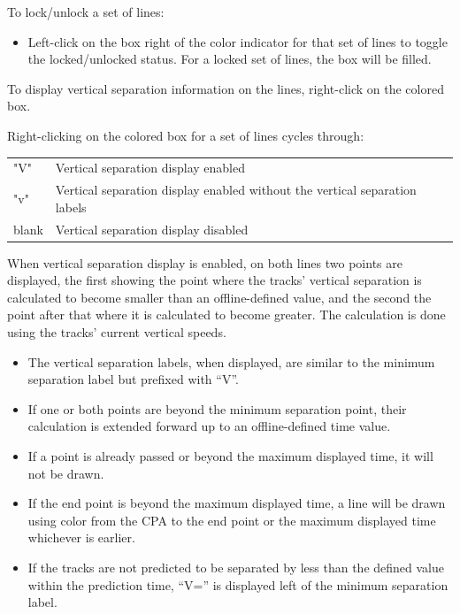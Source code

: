 \documentclass[a4paper,oneside,11pt]{memoir}
\begin{document}
\bigskip

To lock/unlock a set of lines:

\begin{itemize}
    \item Left-click on the box right of the color indicator for that set of lines to toggle the locked/unlocked status. For a locked set of lines, the box will be filled.
\end{itemize}

\bigskip

To display vertical separation information on the lines, right-click on the colored box.

Right-clicking on the colored box for a set of lines cycles through:

\begin{longtable}{p{5cm} p{7.5cm}}
  "V"   & Vertical separation display enabled\\
  "v"   & Vertical separation display enabled without the vertical separation labels\\
  blank & Vertical separation display disabled\\
\end{longtable}

When vertical separation display is enabled, on both lines two points are displayed, the first showing the point where the tracks’ vertical separation is calculated to become smaller than an offline-defined value, and the second the point after that where it is calculated to become greater. The calculation is done using the tracks’ current vertical speeds.

\begin{itemize}
    \item The vertical separation labels, when displayed, are similar to the minimum separation label but prefixed with “V”.
    \item If one or both points are beyond the minimum separation point, their calculation is extended forward up to an offline-defined time value.
    \item If a point is already passed or beyond the maximum displayed time, it will not be drawn.
    \item If the end point is beyond the maximum displayed time, a line will be drawn using  color from the CPA to the end point or the maximum displayed time whichever is earlier.
    \item If the tracks are not predicted to be separated by less than the defined value within the prediction time, “V=” is displayed left of the minimum separation label.
\end{itemize}
\end{document}
